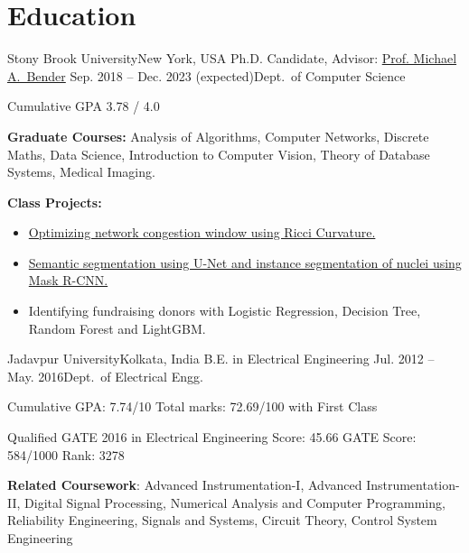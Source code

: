 \documentclass[letterpaper,11pt]{article}
\begin{document}
\section*{Education}
\resumeSubHeadingListStart
\resumeSubheading
{Stony Brook University}{New York, USA}
{Ph.D. Candidate, Advisor: \href{https://www3.cs.stonybrook.edu/~bender/}{Prof. Michael A.\ Bender}}
{Sep. 2018 -- Dec. 2023 (expected)}{Dept.\ of Computer Science}
\resumeItemListStart
\item Cumulative GPA 3.78 / 4.0
\item \textbf{Graduate Courses:} Analysis of Algorithms, Computer Networks, Discrete Maths, Data Science, Introduction to Computer Vision, Theory of Database Systems, Medical Imaging.
\item \textbf{Class Projects:} 
\begin{itemize}
    \item \href{https://github.com/ArghyaB118/network_curvature/blob/master/Text/project_534.pdf}{Optimizing network congestion window using Ricci Curvature.}
    \item \href{https://github.com/ArghyaB118/Image_Segmentation/blob/main/Project_CSE527/Final_Report.pdf}{Semantic segmentation using U-Net and instance segmentation of nuclei using Mask R-CNN.}
    \item {Identifying fundraising donors with Logistic Regression, Decision Tree, Random Forest and LightGBM.}
\end{itemize}
\resumeItemListEnd

\resumeSubheading
{Jadavpur University}{Kolkata, India}
{B.E. in Electrical Engineering }{Jul. 2012 -- May. 2016}{Dept.\ of Electrical Engg.}
\resumeItemListStart
\item {Cumulative GPA: 7.74/10 Total marks: 72.69/100 with First Class}
\item {Qualified GATE 2016 in Electrical Engineering Score: 45.66 GATE Score: 584/1000 Rank: 3278}
\item {\textbf{Related Coursework}: Advanced Instrumentation-I, Advanced Instrumentation-II, Digital Signal Processing, Numerical Analysis and Computer Programming, Reliability Engineering, Signals and Systems, Circuit Theory, Control System Engineering}
\resumeItemListEnd

\resumeSubHeadingListEnd 
\end{document}
